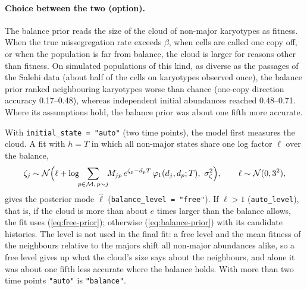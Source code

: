 \documentclass[11pt]{article}
\newcommand{\Normal}{\mathcal{N}}
\begin{document}
\paragraph{Choice between the two (option).}
The balance prior reads the size of the cloud of non-major karyotypes as
fitness. When the true missegregation rate exceeds $\beta$, when cells are
called one copy off, or when the population is far from balance, the cloud is
larger for reasons other than fitness. On simulated populations of this kind,
as diverse as the passages of the Salehi data (about half of the cells on
karyotypes observed once), the balance prior ranked neighbouring karyotypes
worse than chance (one-copy direction accuracy 0.17--0.48), whereas
independent initial abundances reached 0.48--0.71. Where its assumptions hold,
the balance prior was about one fifth more accurate.

With \texttt{initial\_state = "auto"} (two time points), the model first
measures the cloud. A fit with $h=T$ in which all
non-major states share one log factor $\ell$ over the balance,
\begin{equation}
  \zeta_j\sim\Normal\Bigl(\ell+\log\!\!\sum_{p\in\mathcal{M},\,p\sim j}\!\!M_{jp}\,
  e^{\zeta_p-d_pT}\,\varphi_1(d_j,d_p;T),\ \sigma_\zeta^2\Bigr),
  \qquad \ell\sim\Normal(0,3^2),
  \label{eq:balance-level}
\end{equation}
gives the posterior mode $\hat\ell$ (\texttt{balance\_level = "free"}). If
$\hat\ell>1$ (\texttt{auto\_level}), that is, if the cloud is more than about
$e$ times larger than the balance allows, the fit uses (\ref{eq:free-prior});
otherwise (\ref{eq:balance-prior}) with its candidate histories. The level is
not used in the final fit: a free level and the mean fitness of the
neighbours relative to the majors shift all non-major abundances alike, so a
free level gives up what the cloud's size says about the neighbours, and alone
it was about one fifth less accurate where the balance holds. With more than
two time points \texttt{"auto"} is \texttt{"balance"}.
\end{document}
